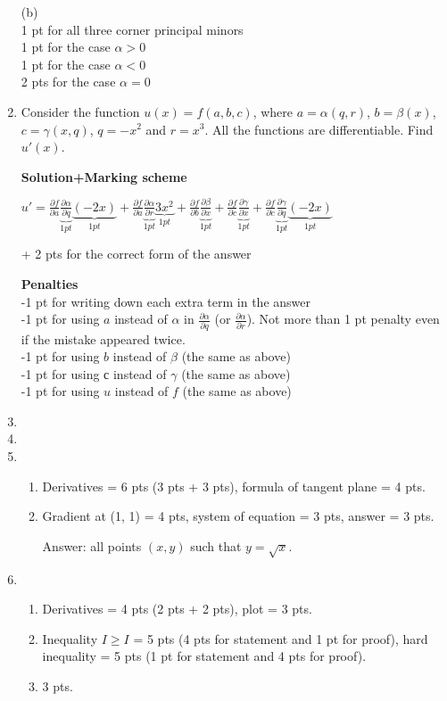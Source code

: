 \begin{enumerate}
  (b)\\
  1 pt for all three corner principal minors\\
  1 pt for the case $\alpha > 0$\\
  1 pt for the case $\alpha <0$\\
  2 pts for the case $\alpha =0$


  \item

  Consider the function $u(x)=f(a,b,c)$, where $a=\alpha(q,r)$, $b=\beta(x)$, $c=\gamma(x,q)$, $q=-x^2$ and $r=x^3$. All the functions are differentiable. Find $u'(x)$.

  \textbf{Solution+Marking scheme}

  $\displaystyle
  u'=\frac{\partial f}{\partial a}\underbrace{\frac{\partial \alpha}{\partial q}}_{1 pt}\underbrace{(-2x)}_{1 pt}+\frac{\partial f}{\partial a}\underbrace{\frac{\partial \alpha}{\partial r}}_{1 pt}\underbrace{3x^2}_{1 pt}+\frac{\partial f}{\partial b}\underbrace{\frac{\partial \beta}{\partial x}}_{1 pt}+\frac{\partial f}{\partial c}\underbrace{\frac{\partial \gamma}{\partial x}}_{1 pt}+\frac{\partial f}{\partial c}\underbrace{\frac{\partial\gamma}{\partial q}}_{1 pt}\underbrace{(-2x)}_{1 pt}$

  + 2 pts for the correct form of the answer

  \textbf{Penalties}\\
  -1 pt for writing down each extra term in the answer\\
  -1 pt for using $a$ instead of $\alpha$ in $\frac{\partial \alpha}{\partial q}$ (or $\frac{\partial \alpha}{\partial r}$). Not more than 1 pt penalty even if the mistake appeared twice.\\
  -1 pt for using $b$ instead of $\beta$ (the same as above)\\
  -1 pt for using $с$ instead of $\gamma$ (the same as above)\\
  -1 pt for using $u$ instead of $f$ (the same as above)

 \item

 \item

 \item
 \begin{enumerate}
   \item Derivatives = 6 pts (3 pts + 3 pts), formula of tangent plane = 4 pts.
   \item Gradient at (1, 1) = 4 pts, system of equation = 3 pts, answer = 3 pts.

   Answer: all points $(x, y)$ such that $y=\sqrt{x}$.
 \end{enumerate}
  \item
  \begin{enumerate}
    \item Derivatives = 4 pts (2 pts + 2 pts), plot = 3 pts.
    \item Inequality $I \geq I$ = 5 pts (4 pts for statement and 1 pt for proof),
    hard inequality = 5 pts (1 pt for statement and 4 pts for proof).
    \item 3 pts.
  \end{enumerate}

\end{enumerate}
